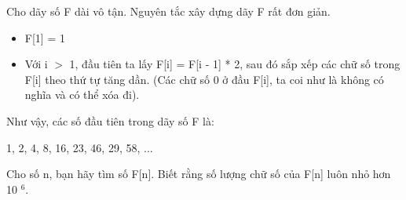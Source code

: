 Cho dãy số F dài vô tận. Nguyên tắc xây dựng dãy F rất đơn giản.  
\begin{itemize}
	\item     F[1] = 1   
	\item     Với i $>$ 1, đầu tiên ta lấy F[i] = F[i - 1] * 2, sau đó sắp xếp các chữ số trong F[i] theo thứ tự tăng dần. (Các chữ số 0 ở đầu F[i], ta coi như là không có nghĩa và có thể xóa đi).   
\end{itemize}

   Như vậy, các số đầu tiên trong dãy số F là:  

   1, 2, 4, 8, 16, 23, 46, 29, 58, ...  

   Cho số n, bạn hãy tìm số F[n]. Biết rằng số lượng chữ số của F[n] luôn nhỏ hơn 10   $^    6.   $